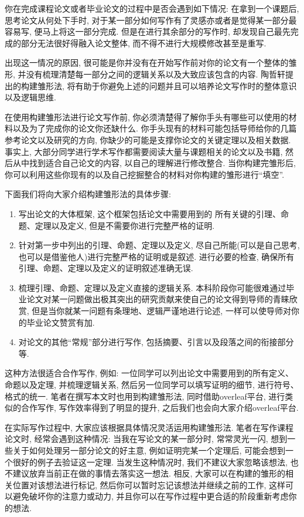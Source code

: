 \documentclass{formatBook}
\begin{document}
你在完成课程论文或者毕业论文的过程中是否会遇到如下情况: 在拿到一个课题后, 思考论文从何处下手时, 对于某一部分如何写作有了灵感亦或者是觉得某一部分最容易写, 便马上将这一部分完成. 但是在进行其余部分的写作时, 却发现自己最先完成的部分无法很好得融入论文整体, 而不得不进行大规模修改甚至是重写. \par
出现这一情况的原因, 很可能是你并没有在开始写作前对你的论文有一个整体的雏形, 并没有梳理清楚每一部分之间的逻辑关系以及大致应该包含的内容. 陶哲轩提出的构建雏形法, 将有助于你避免上述的问题并且可以培养论文写作时的整体意识以及逻辑思维. \par
在使用构建雏形法进行论文写作前, 你必须清楚得了解你手头有哪些可以使用的材料以及为了完成你的论文你还缺什么. 你手头现有的材料可能包括导师给你的几篇参考论文以及研究的方向, 你缺少的可能是支撑你论文的关键定理以及相关数据. 事实上, 大部分同学进行学术写作都需要阅读大量与课题相关的论文以及书籍, 然后从中找到适合自己论文的内容, 以自己的理解进行修改整合. 当你构建完雏形后, 你可以利用这些你现有的以及自己挖掘整合的材料对你构建的雏形进行“填空”. \par
下面我们将向大家介绍构建雏形法的具体步骤: 
\begin{enumerate}
    \item 写出论文的大体框架, 这个框架包括论文中需要用到的 所有关键的引理、命题、定理以及定义, 但是不需要你进行完整严格的证明. 
    \item 针对第一步中列出的引理、命题、定理以及定义, 尽自己所能(可以是自己思考, 也可以是借鉴他人)进行完整严格的证明或是叙述. 进行必要的检查, 确保所有引理、命题、定理以及定义的证明叙述准确无误. 
    \item 梳理引理、命题、定理以及定义直接的逻辑关系. 本科阶段你可能很难通过毕业论文对某一问题做出极其突出的研究贡献来使自己的论文得到导师的青睐欣赏, 但是当你就某一问题有条理地、逻辑严谨地进行论述, 一样可以使导师对你的毕业论文赞赏有加. 
    \item 对论文的其他“常规”部分进行写作, 包括摘要、引言以及段落之间的衔接部分等. 
\end{enumerate}
\par
这种方法很适合合作写作, 例如: 一位同学可以列出论文中需要用到的所有定义、命题以及定理, 并梳理逻辑关系, 然后另一位同学可以填写证明的细节, 进行符号、格式的统一. 笔者在撰写本文时也用到构建雏形法, 同时借助overleaf平台, 进行类似的合作写作, 写作效率得到了明显的提升, 之后我们也会向大家介绍overleaf平台. \par
在实际写作过程中, 大家应该根据具体情况灵活运用构建雏形法. 笔者在写作课程论文时, 经常会遇到这种情况: 当我在写论文的某一部分时, 常常灵光一闪, 想到一些关于如何处理另一部分论文的好主意, 例如证明完某一个定理后, 可能会想到一个很好的例子去验证这一定理. 当发生这种情况时, 我们不建议大家忽略该想法, 也不建议放弃当前正在做的事情去落实这一想法. 相反, 大家可以在构建的雏形的相关位置对该想法进行标记, 然后你可以暂时忘记该想法并继续之前的工作, 这样可以避免破坏你的注意力或动力, 并且你可以在写作过程中更合适的阶段重新考虑你的想法. 
\end{document}
